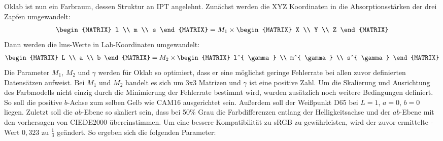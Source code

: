 \documentclass[12pt, a4paper, ngerman]{article}
\begin{document}
Oklab ist nun ein Farbraum, dessen Struktur an IPT angelehnt.
Zunächst werden die XYZ Koordinaten in die Absorptionsstärken der drei Zapfen umgewandelt:
\begin{equation}
  \begin{aligned}
    \begin{MATRIX} l \\ m \\ s \end{MATRIX} = M_1 \times \begin{MATRIX} X \\ Y \\ Z \end{MATRIX}
  \end{aligned}
\end{equation}
Dann werden die lms-Werte in Lab-Koordinaten umgewandelt:
\begin{equation}
  \begin{aligned}
    \begin{MATRIX} L \\ a \\ b \end{MATRIX} = M_2 \times \begin{MATRIX} l^{ \gamma } \\ m^{ \gamma } \\ s^{ \gamma } \end{MATRIX}
  \end{aligned}
\end{equation}
Die Parameter \(M_1\), \(M_2\) und \(\gamma\) werden für Oklab so optimiert, 
dass er eine möglichst geringe Fehlerrate bei allen zuvor definierten Datensätzen aufweist. 
Bei \(M_1\) und \(M_2\) handelt es sich um 3x3 Matrizen und \(\gamma\) ist eine positive Zahl. 
Um die Skalierung und Ausrichtung des Farbmodells nicht einzig durch die Minimierung der Fehlerrate bestimmt wird, wurden zusätzlich noch weitere Bedingungen definiert.
So soll die positive \(b\)-Achse zum selben Gelb wie CAM16 ausgerichtet sein. 
Außerdem soll der Weißpunkt D65 bei \(L=1\), \(a=0\), \(b=0\) liegen. 
Zuletzt soll die \(ab\)-Ebene so skaliert sein, dass bei 50\% Grau die Farbdifferenzen entlang der Helligkeitsachse und 
der \(ab\)-Ebene mit den vorhersagen von CIEDE2000 übereinstimmen. 
Um eine bessere Kompatibilität zu sRGB zu gewährleisten, wird der zuvor ermittelte \gamma-Wert \(0,323\) zu \(\frac{ 1 }{ 3 }\) geändert. 
So ergeben sich die folgenden Parameter:  
\end{document}
